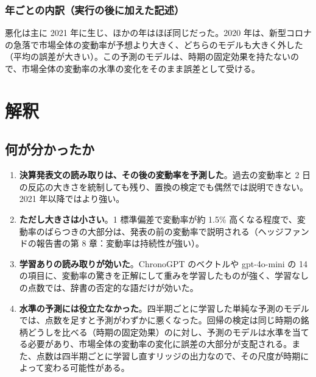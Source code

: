 \subsection*{年ごとの内訳（実行の後に加えた記述）}

\begin{table}[H]
\centering\small
\caption{標本外の予測の二乗誤差の年ごとの平均（事前登録にない記述）}
\label{tab:forecastyear}
\end{table}

悪化は主に 2021 年に生じ、ほかの年はほぼ同じだった。2020 年は、新型コロナの急落で市場全体の変動率が予想より大きく、どちらのモデルも大きく外した（平均の誤差が大きい）。この予測のモデルは、時期の固定効果を持たないので、市場全体の変動率の水準の変化をそのまま誤差として受ける。

\chapter{解釈}\label{ch:interpret}

\section{何が分かったか}

\begin{enumerate}
\item \textbf{決算発表文の読み取りは、その後の変動率を予測した}。過去の変動率と 2 日の反応の大きさを統制しても残り、置換の検定でも偶然では説明できない。2021 年以降ではより強い。
\item \textbf{ただし大きさは小さい}。1 標準偏差で変動率が約 1.5\% 高くなる程度で、変動率のばらつきの大部分は、発表の前の変動率で説明される（ヘッジファンドの報告書の第 8 章：変動率は持続性が強い）。
\item \textbf{学習ありの読み取りが効いた}。ChronoGPT のベクトルや gpt-4o-mini の 14 の項目に、変動率の驚きを正解にして重みを学習したものが強く、学習なしの点数では、辞書の否定的な語だけが効いた。
\item \textbf{水準の予測には役立たなかった}。四半期ごとに学習した単純な予測のモデルでは、点数を足すと予測がわずかに悪くなった。回帰の検定は同じ時期の銘柄どうしを比べる（時期の固定効果）のに対し、予測のモデルは水準を当てる必要があり、市場全体の変動率の変化に誤差の大部分が支配される。また、点数は四半期ごとに学習し直すリッジの出力なので、その尺度が時期によって変わる可能性がある。
\end{enumerate}

